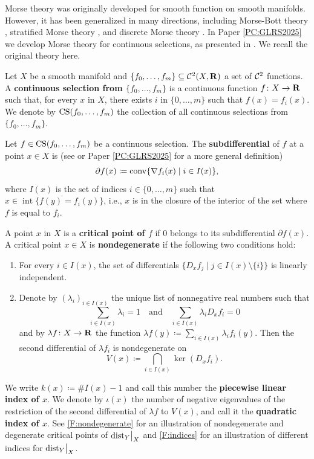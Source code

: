 Morse theory was originally developed for smooth function on smooth manifolds. However, it has been generalized in many directions, including Morse-Bott theory \cite{AustinBraam1995}, stratified Morse theory \cite{GoreskyMacPherson1988}, and discrete Morse theory \cite{Forman2002}. In Paper \ref{PC:GLRS2025} we develop Morse theory for continuous selections, as presented in \cite{APS1997}. We recall the original theory here.

\begin{definition}
\label{!D:continuous-selection}
  Let $X$ be a smooth manifold and $\{f_0, \ldots, f_m\} \subseteq \mathcal{C}^2(X, \mathbf{R})$ a set of $\mathcal{C}^2$ functions. A \textbf{continuous selection from $\{f_0, \ldots, f_m\}$} is a continuous function $f \colon X \to \mathbf{R}$ such that, for every $x$ in $X$, there exists $i$ in $\{0, \ldots, m\}$ such that $f(x) = f_i(x)$. We denote by $\operatorname{CS}(f_0, \ldots, f_m)$ the collection of all continuous selections from $\{f_0, \ldots, f_m\}$.
  
  Let $f \in \operatorname{CS}(f_0, \ldots, f_m)$ be a continuous selection. The \textbf{subdifferential} of $f$ at a point $x \in X$ is (see \cite{APS1997} or Paper \ref{PC:GLRS2025} for a more general definition)
  \[
    \partial f(x) \coloneq \operatorname{conv}\{\nabla f_i(x) \mid i \in I(x)\},
  \]
  where $I(x)$ is the set of indices $i \in \{0, \ldots, m\}$ such that $x \in \overline{\operatorname{int} \{f(y) = f_i(y)\}}$, i.e., $x$ is in the closure of the interior of the set where $f$ is equal to $f_i$.
  
  A point $x$ in $X$ is a \textbf{critical point of $f$} if $0$ belongs to its subdifferential $\partial f(x)$. A critical point $x \in X$ is \textbf{nondegenerate} if the following two conditions hold:
  \begin{enumerate}
    \item For every $i \in I(x)$, the set of differentials $\{D_x f_j \mid j \in I(x) \setminus \{i\}\}$ is linearly independent.
    \item Denote by $(\lambda_i)_{i \in I(x)}$ the unique list of nonnegative real numbers such that
    \[
      \sum_{i \in I(x)} \lambda_i = 1
      \quad \text{and} \quad
      \sum_{i \in I(x)} \lambda_i D_x f_i = 0
    \]
    and by $\lambda f \colon X \to \mathbf{R}$ the function $\lambda f(y) \coloneq \sum_{i \in I(x)} \lambda_i f_i(y)$. Then the second differential of $\lambda f_i$ is nondegenerate on
    \[
      V(x) \coloneq \bigcap_{i \in I(x)} \ker(D_x f_i).
    \]
  \end{enumerate}
  We write $k(x) \coloneq \#I(x) - 1$ and call this number the \textbf{piecewise linear index of $x$}. We denote by $\iota(x)$ the number of negative eigenvalues of the restriction of the second differential of $\lambda f$ to $V(x)$, and call it the \textbf{quadratic index of $x$}. See \cref{F:nondegenerate} for an illustration of nondegenerate and degenerate critical points of $\mathord{\operatorname{dist}}_Y\big|_X$ and \cref{F:indices} for an illustration of different indices for $\mathord{\operatorname{dist}}_Y\big|_X$.
\end{definition}

